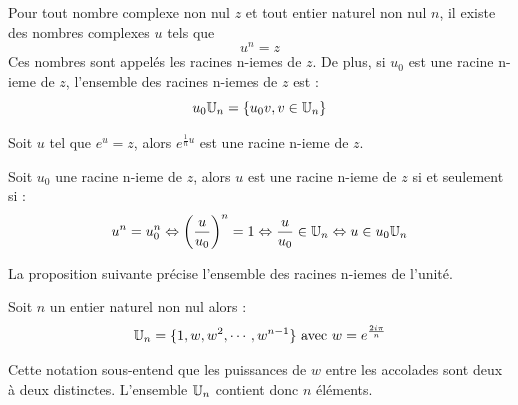 \begin{prop}
 Pour tout nombre complexe non nul $z$ et tout entier naturel non nul $n$, il existe des nombres complexes $u$ tels que
\begin{displaymath}
 u^{n}=z
\end{displaymath}
Ces nombres sont appelés les racines n-iemes de $z$. De plus, si $u_0$ est une racine n-ieme de $z$, l'ensemble des racines n-iemes de $z$ est :
\begin{displaymath}
 u_0 \mathbb{U}_n = \left\lbrace u_0 v , v\in \mathbb{U}_n\right\rbrace 
\end{displaymath}
\end{prop}
\begin{demo}
 Soit $u$ tel que $e^u=z$, alors $e^{\frac{1}{n}u}$ est une racine n-ieme de $z$.

Soit $u_0$ une racine n-ieme de $z$, alors $u$ est une racine n-ieme de $z$ si et seulement si :
\begin{displaymath}
 u^n = u_0^n \Leftrightarrow \left( \dfrac{u}{u_0}\right)^n  = 1 \Leftrightarrow \dfrac{u}{u_0} \in \mathbb{U}_n 
\Leftrightarrow u\in u_0 \mathbb{U}_n
\end{displaymath}
\end{demo}
La proposition suivante précise l'ensemble des racines n-iemes de l'unité.
\begin{prop}
 Soit $n$ un entier naturel non nul alors :
\begin{displaymath}
 \mathbb{U}_n = \{ 1, w, w^2, \cdots , w^{n-1} \} \text{ avec } w = e^{\frac{2i\pi}{n}}
\end{displaymath}
\end{prop}
\begin{rem}
 Cette notation sous-entend que les puissances de $w$ entre les accolades sont deux à deux distinctes. L'ensemble $\mathbb{U}_n$ contient donc $n$ éléments.
\end{rem}

